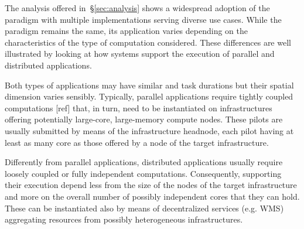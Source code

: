 \documentclass{sig-alternate}
\begin{document}
The analysis offered in~\S\ref{sec:analysis} shows a widespread adoption of the
\pilot paradigm with multiple implementations serving diverse use cases. While
the paradigm remains the same, its application varies depending on the
characteristics of the type of computation considered. These differences are
well illustrated by looking at how \pilot systems support the execution of
parallel and distributed applications.

Both types of applications may have similar \pilot and task durations but their
spatial dimension varies sensibly. Typically, parallel applications require
tightly coupled computations [ref] that, in turn, need \pilots to be
instantiated on infrastructures offering potentially large-core, large-memory
compute nodes. These pilots are usually submitted by means of the
infrastructure headnode, each pilot having at least as many core as those
offered by a node of the target infrastructure.

Differently from parallel applications, distributed applications usually
require loosely coupled or fully independent computations. Consequently,
\pilots supporting their execution depend less from the size of the nodes of
the target infrastructure and more on the overall number of possibly
independent cores that they can hold. These \pilots can be instantiated also by
means of decentralized services (e.g. WMS) aggregating resources from possibly
heterogeneous infrastructures.

\end{document}
